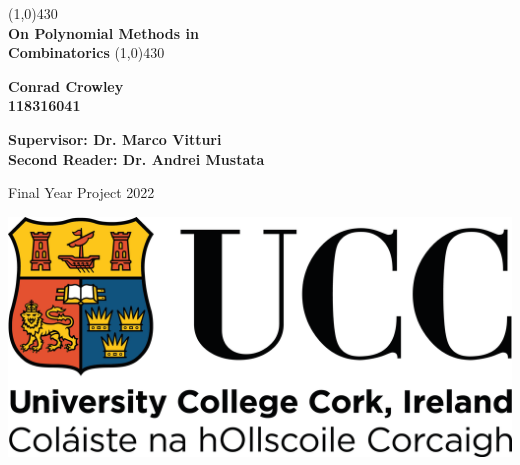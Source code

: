 \begin{titlepage}


    \begin{center}
    \line(1,0){430}\\
    \vspace{5pt}
    {\Huge \bf On Polynomial Methods in \\ \vspace{5pt} Combinatorics}
    \line(1,0){430}
    
    \end{center}
    
    \vfill
    
    \begin{center}

    \end{center}
    
    \vfill
    \begin{center}
    {\large \bf  Conrad Crowley }\\
    { \large \bf 118316041}\\
    
    
    \end{center}

    \begin{center}
        {\large \bf  Supervisor: Dr. Marco Vitturi }\\
        { \large \bf Second Reader: Dr. Andrei Mustata}\\
        
        \end{center}
    
    
    \vfill
    
    
    \begin{center}
    \end{center}
    
    \vfill
    \begin{center}
    {Final Year Project 2022}
    \end{center}
    
    \vfill
        
    \begin{center}
    \includegraphics[scale=0.2]{./images/ucc}
    \end{center}
    
    
    
    \end{titlepage}
    